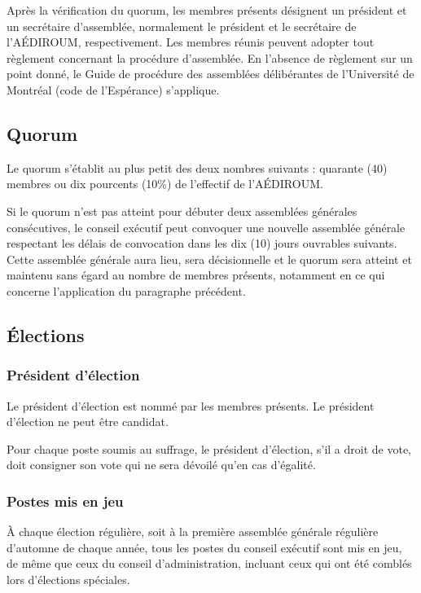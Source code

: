 \documentclass[12pt]{article}
\begin{document}
Après la vérification du quorum, les membres présents désignent un président et un secrétaire d'assemblée, normalement le président et le secrétaire de l'AÉDIROUM, respectivement.
Les membres réunis peuvent adopter tout règlement concernant la procédure d'assemblée. En l'absence de règlement sur un point donné, le Guide de procédure des assemblées délibérantes de l'Université de Montréal (code de l'Espérance) s'applique.

\subsection{Quorum}

 Le quorum s'établit au plus petit des deux nombres suivants : quarante (40) membres ou dix pourcents (10\%) 
de l'effectif de l'AÉDIROUM.

Si le quorum n’est pas atteint pour débuter deux assemblées générales consécutives, le conseil exécutif peut 
convoquer une nouvelle assemblée générale respectant les délais de convocation dans les dix (10) jours ouvrables 
suivants. Cette assemblée générale aura lieu, sera décisionnelle et le quorum sera atteint et maintenu sans égard 
au nombre de membres présents, notamment en ce qui concerne l'application du paragraphe précédent.

\subsection{Élections}
\subsubsection{Président d'élection}

Le président d'élection est nommé par les membres présents. Le président d'élection ne peut être candidat.

Pour chaque poste soumis au suffrage, le président d'élection, s'il a droit de vote, doit consigner son vote qui ne sera dévoilé qu'en cas d'égalité.

\subsubsection{Postes mis en jeu}
À chaque élection régulière, soit à la première assemblée générale régulière d'automne de chaque année, tous les postes du conseil exécutif sont mis en jeu, de même que ceux du conseil d'administration, incluant ceux qui ont été comblés lors d'élections spéciales.
\end{document}

